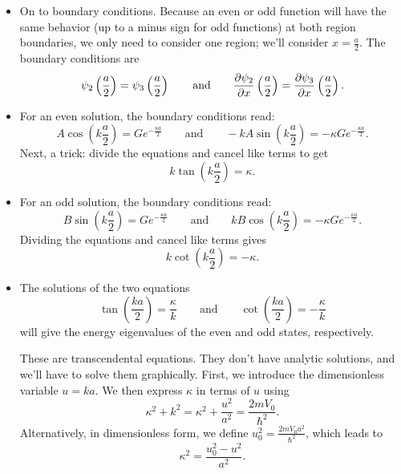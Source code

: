 \documentclass[11pt, a4paper]{article}
\newcommand{\eqtext}[1]{\qquad \text{#1} \qquad}
\begin{document}
\begin{itemize}
	\item On to boundary conditions. Because an even or odd function will have the same behavior (up to a minus sign for odd functions) at both region boundaries, we only need to consider one region; we'll consider $ x = \frac{a}{2} $. The boundary conditions are
	\begin{equation*}
		\psi_{2}\left(\frac{a}{2}\right) = \psi_{3}\left(\frac{a}{2}\right) \eqtext{and} \pdv{\psi_{2}}{x}\left(\frac{a}{2}\right) = \pdv{\psi_{3}}{x}\left(\frac{a}{2}\right).
	\end{equation*}
	
	\item For an even solution, the boundary conditions read:
	\begin{equation*}
		A \cos\left(k\frac{a}{2}\right) = Ge^{-\frac{\kappa a}{2}} \eqtext{and} -kA\sin(k\frac{a}{2}) = - \kappa Ge^{-\frac{\kappa a}{2}}.
	\end{equation*}
	Next, a trick: divide the equations and cancel like terms to get
	\begin{equation*}
		k \tan (k\frac{a}{2}) = \kappa.
	\end{equation*}
	
	\item For an odd solution, the boundary conditions read:
	\begin{equation*}
		B \sin \left(k\frac{a}{2}\right) = Ge^{-\frac{\kappa a}{2}} \eqtext{and} kB\cos(k\frac{a}{2}) = -\kappa Ge^{-\frac{\kappa a}{2}}.
	\end{equation*}
	Dividing the equations and cancel like terms gives
	\begin{equation*}
		k \cot (k\frac{a}{2}) = -\kappa.
	\end{equation*}
	
	\item The solutions of the two equations
	\begin{equation*}
		\tan (\frac{ka}{2}) = \frac{\kappa}{k}  \eqtext{and}  \cot (\frac{ka}{2}) = -\frac{\kappa}{k} 
	\end{equation*}
	will give the energy eigenvalues of the even and odd states, respectively. 
	
	These are transcendental equations. They don't have analytic solutions, and we'll have to solve them graphically. First, we introduce the dimensionless variable $ u = k a $. We then express $ \kappa $ in terms of $ u $ using
	\begin{equation*}
		\kappa^{2} + k^{2} = \kappa^{2} + \frac{u^{2}}{a^{2}}  = \frac{2mV_{0}}{\hbar^{2}}.
	\end{equation*}
	Alternatively, in dimensionless form, we define $ u_{0}^{2} = \frac{2mV_{0}a^{2}}{\hbar^{2}} $, which leads to
	\begin{equation*}
		\kappa^{2} = \frac{u_{0}^{2} - u^{2}}{a^{2}}.
	\end{equation*}
	

\end{itemize}
\end{document}
